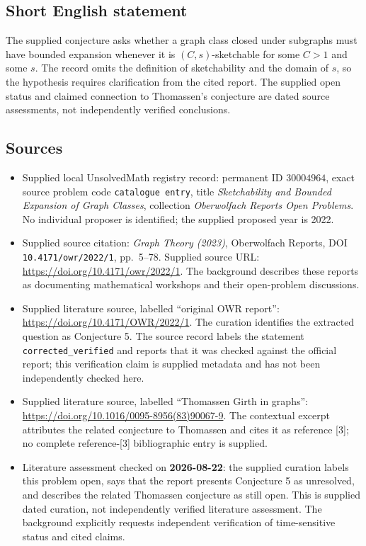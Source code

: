 \documentclass[11pt]{article}
\begin{document}
\subsection{Short English statement}
The supplied conjecture asks whether a graph class closed under subgraphs must have bounded expansion whenever it is \((C,s)\)-sketchable for some \(C>1\) and some \(s\). The record omits the definition of sketchability and the domain of \(s\), so the hypothesis requires clarification from the cited report. The supplied open status and claimed connection to Thomassen's conjecture are dated source assessments, not independently verified conclusions.
\subsection{Sources}
\begin{itemize}
\item Supplied local UnsolvedMath registry record: permanent ID \(30004964\), exact source problem code \texttt{catalogue entry}, title \emph{Sketchability and Bounded Expansion of Graph Classes}, collection \emph{Oberwolfach Reports Open Problems}. No individual proposer is identified; the supplied proposed year is 2022.
\item Supplied source citation: \emph{Graph Theory (2023)}, Oberwolfach Reports, DOI \texttt{10.4171/owr/2022/1}, pp.\ 5--78. Supplied source URL: \url{https://doi.org/10.4171/owr/2022/1}. The background describes these reports as documenting mathematical workshops and their open-problem discussions.
\item Supplied literature source, labelled ``original OWR report'': \url{https://doi.org/10.4171/OWR/2022/1}. The curation identifies the extracted question as Conjecture 5. The source record labels the statement \texttt{corrected\_verified} and reports that it was checked against the official report; this verification claim is supplied metadata and has not been independently checked here.
\item Supplied literature source, labelled ``Thomassen Girth in graphs'': \url{https://doi.org/10.1016/0095-8956(83)90067-9}. The contextual excerpt attributes the related conjecture to Thomassen and cites it as reference [3]; no complete reference-[3] bibliographic entry is supplied.
\item Literature assessment checked on \textbf{2026-08-22}: the supplied curation labels this problem open, says that the report presents Conjecture 5 as unresolved, and describes the related Thomassen conjecture as still open. This is supplied dated curation, not independently verified literature assessment. The background explicitly requests independent verification of time-sensitive status and cited claims.
\end{itemize}
\end{document}
